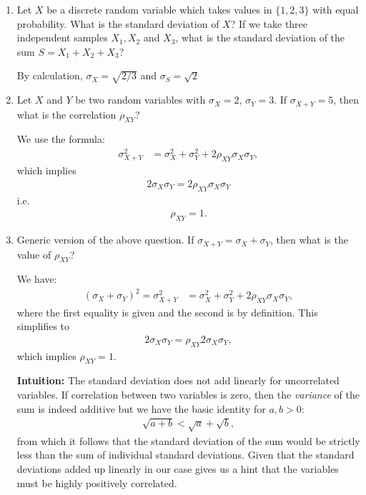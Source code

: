 \documentclass{amsart}
\theoremstyle{plain}
\numberwithin{equation}{section}
\begin{document}
\begin{enumerate}
\item Let $X$ be a discrete random variable which
takes values in $\lbrace 1, 2, 3 \rbrace$ with 
equal probability. What is the standard deviation of $X$?
If we take three independent samples $X_1, X_2$ and 
$X_3$, what is the standard deviation of the sum 
$S = X_1 + X_2 + X_3$?

By calculation, $\sigma_X = \sqrt{2/3}$ and 
$\sigma_S = \sqrt{2}$

\item Let $X$ and $Y$ be two random variables with
$\sigma_X=2$, $\sigma_Y=3$. If $\sigma_{X+Y} = 5$, 
then what is the correlation $\rho_{XY}$?

We use the formula:
\begin{align*}
\sigma_{X+Y}^2 &= \sigma_{X}^2 + \sigma_{Y}^2 + 2 \rho_{XY} \sigma_X \sigma_Y,
\end{align*}
which implies
\begin{align*}
2 \sigma_X \sigma_Y = 
2 \rho_{XY} \sigma_X \sigma_Y
\end{align*}
i.e.\,
\begin{align*}
\rho_{XY} = 1.
\end{align*}

\item Generic version of the above question. If 
$\sigma_{X+Y} = \sigma_X + \sigma_Y$, then what is the 
value of $\rho_{XY}$?

We have:
\begin{align*}
(\sigma_X + \sigma_Y)^2 = \sigma_{X+Y}^2 &= \sigma_{X}^2 + \sigma_{Y}^2 + 
2 \rho_{XY} \sigma_X \sigma_Y,
\end{align*}
where the first equality is given and the second is by 
definition. This simplifies to 
\begin{align*}
2\sigma_X \sigma_Y = \rho_{XY} 2\sigma_X \sigma_Y,
\end{align*}
which implies $\rho_{XY} = 1$.

\textbf{Intuition:} The standard deviation
does not add linearly for uncorrelated variables. 
If correlation between two variables is zero, then 
the \emph{variance} of the sum is indeed additive
but we have the basic identity for $a, b>0$:
\begin{align*}
\sqrt{a + b}<\sqrt{a} + \sqrt{b},
\end{align*}
from which it follows that the standard deviation of 
the sum would be
strictly less than the sum of individual 
standard deviations. Given that the standard 
deviations added up linearly in our case gives us 
a hint that the variables must be highly positively correlated. 



\end{enumerate}
\end{document}
